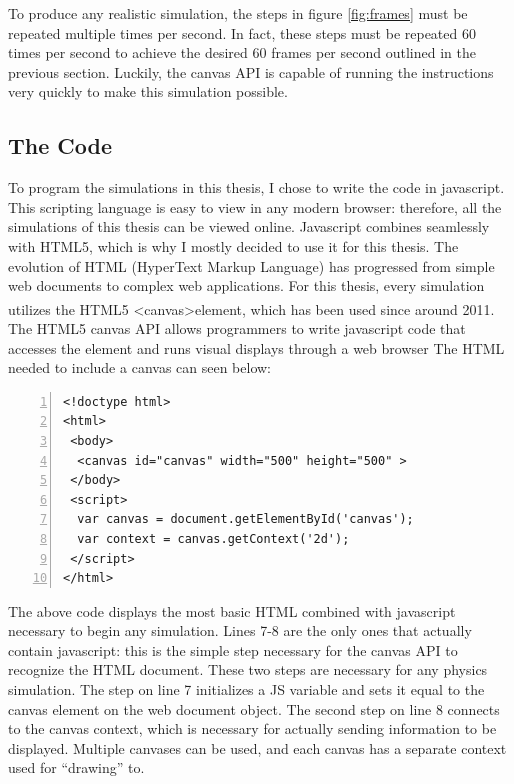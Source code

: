 To produce any realistic simulation, the steps in figure \ref{fig:frames} must be repeated multiple times per second.  In fact, these steps must be repeated 60 times per second to achieve the desired 60 frames per second outlined in the previous section.  Luckily, the canvas API is capable of running the instructions very quickly to make this simulation possible.  










\subsection{The Code}

To program the simulations in this thesis, I chose to write the code in javascript.  This scripting language is easy to view in any modern browser: therefore, all the simulations of this thesis can be viewed online.  Javascript combines seamlessly with HTML5, which is why I mostly decided to use it for this thesis.  The evolution of HTML (HyperText Markup Language) has progressed from simple web documents to complex web applications.  For this thesis, every simulation utilizes the HTML5 \textless canvas\textgreater element, which has been used since around 2011.\textsuperscript{\cite{basichtml5}}  The HTML5 canvas API allows programmers to write javascript code that accesses the element and runs visual displays through a web browser  The HTML needed to include a canvas can seen below:



\vspace{1cm}
\begin{lstlisting}[breaklines=true, frame=single, numbers=left, caption= The bare bones code necessary for an HTML document to include the canvas element.  The canvas in this situation is a 500 pixel square., label=lst:basichtml]  
<!doctype html>
<html>
 <body>
  <canvas id="canvas" width="500" height="500" >  
 </body>
 <script>
  var canvas = document.getElementById('canvas');
  var context = canvas.getContext('2d');
 </script>
</html>

\end{lstlisting}

The above code displays the most basic HTML combined with javascript necessary to begin any simulation.  Lines 7-8 are the only ones that actually contain javascript: this is the simple step necessary for the canvas API to recognize the HTML document.  These two steps are necessary for any physics simulation.  The step on line 7 initializes a JS variable and sets it equal to the canvas element on the web document object.  The second step on line 8 connects to the canvas context, which is necessary for actually sending information to be displayed.  Multiple canvases can be used, and each canvas has a separate context used for ``drawing'' to. 

